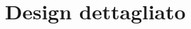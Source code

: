 \documentclass[a4paper,12pt]{report}
\begin{document}
\section{Design dettagliato}

%
%
\end{document}
